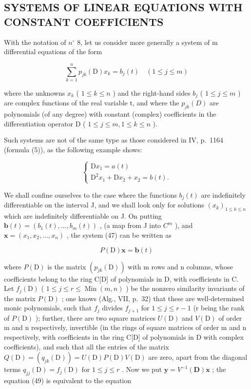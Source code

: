 \subsection{SYSTEMS OF LINEAR EQUATIONS WITH CONSTANT COEFFICIENTS}

With the notation of \(n^{\circ}\) 8, let us consider more generally a system of m differential equations of the form

\[
\sum_ {k = 1} ^ {n} p _ {j k} (\mathrm{D}) x _ {k} = b _ {j} (t) \quad (1 \leqslant j \leqslant m)\tag{47}
\]

where the unknowns \(x_{k}\) ( \(1 \leqslant k \leqslant n\) ) and the right-hand sides \(b_{j}\) ( \(1 \leqslant j \leqslant m\) ) are complex functions of the real variable t, and where the \(p_{jk}(D)\) are polynomials (of any degree) with constant (complex) coefficients in the differentiation operator D ( \(1 \leqslant j \leqslant m, 1 \leqslant k \leqslant n\) ).

Such systems are not of the same type as those considered in IV, p.~1164 (formula (5)), as the following example shows:

\[
\left\{ \begin{array}{c} \mathrm{D} x _ {1} = a (t) \\ \mathrm{D} ^ {2} x _ {1} + \mathrm{D} x _ {2} + x _ {2} = b (t). \end{array} \right.\tag{48}
\]

We shall confine ourselves to the case where the functions \(b_{j}(t)\) are indefinitely differentiable on the interval J, and we shall look only for solutions \((x_{k})_{1\leqslant k\leqslant n}\) which are indefinitely differentiable on J. On putting \(\mathbf{b}(t)=\left(b_{1}(t),\ldots,b_{m}(t)\right)\) , (a map from J into \(C^{m}\) ), and \(\mathbf{x}=\left(x_{1},x_{2},\ldots,x_{n}\right)\) , the system (47) can be written as

\[
P (\mathrm{D}) \mathbf {x} = \mathbf {b} (t)\tag{49}
\]

where \(P(\mathrm{D})\) is the matrix \((p_{jk}(\mathrm{D}))\) with m rows and n columns, whose coefficients belong to the ring C{[}D{]} of polynomials in D, with coefficients in C. Let \(f_{j}(\mathrm{D})\) ( \(1 \leqslant j \leqslant r \leqslant \operatorname{Min}(m, n)\) ) be the nonzero similarity invariants of the matrix \(P(\mathrm{D})\) ; one knows (Alg., VII, p.~32) that these are well-determined monic polynomials, such that \(f_{j}\) divides \(f_{j+1}\) for \(1 \leqslant j \leqslant r - 1\) (r being the rank of \(P(\mathrm{D})\) ); further, there are two square matrices \(U(\mathrm{D})\) and \(V(\mathrm{D})\) of order m and n respectively, invertible (in the rings of square matrices of order m and n respectively, with coefficients in the ring C{[}D{]} of polynomials in D with complex coefficients), and such that all the entries of the matrix \(Q(\mathrm{D}) = (q_{jk}(\mathrm{D})) = U(\mathrm{D}) P(\mathrm{D}) V(\mathrm{D})\) are zero, apart from the diagonal terms \(q_{jj}(\mathrm{D}) = f_{j}(\mathrm{D})\) for \(1 \leqslant j \leqslant r\) . Now we put \(\mathbf{y} = V^{-1}(\mathbf{D})\mathbf{x}\) ; the equation (49) is equivalent to the equation

